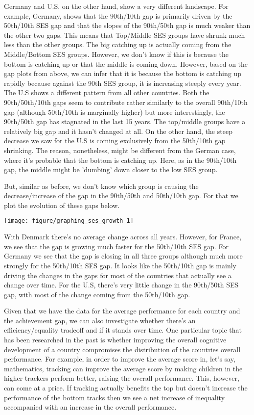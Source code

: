 \documentclass[11pt, a4paper]{article}\usepackage[]{graphicx}\usepackage[]{color}
\begin{document}
Germany and U.S, on the other hand, show a very different landscape. For example, Germany, shows that the 90th/10th gap is primarily driven by the 50th/10th SES gap and that the slopes of the 90th/50th gap is much weaker than the other two gaps. This means that Top/Middle SES groups have shrunk much less than the other groups. The big catching up is actually coming from the Middle/Bottom SES groups. However, we don't know if this is because the bottom is catching up or that the middle is coming down. However, based on the gap plots from above, we can infer that it is because the bottom is catching up rapidly because against the 90th SES group, it is increasing steeply every year. The U.S shows a different pattern from all other countries. Both the 90th/50th/10th gaps seem to contribute rather similarly to the overall 90th/10th gap (although 50th/10th is marginally higher) but more interestingly, the 90th/50th gap has stagnated in the last 15 years. The top/middle groups have a relatively big gap and it hasn't changed at all. On the other hand, the steep decrease we saw for the U.S is coming exclusively from the 50th/10th gap shrinking. The reason, nonetheless, might be different from the German case, where it's probable that the bottom is catching up. Here, as in the 90th/10th gap, the middle might be 'dumbing' down closer to the low SES group.

But, similar as before, we don't know which group is causing the decrease/increase of the gap in the 90th/50th and 50th/10th gap. For that we plot the evolution of these gaps below.




{\centering \texttt{[image: figure/graphing\_ses\_growth-1]} 

}




With Denmark there's no average change across all years. However, for France, we see that the gap is growing much faster for the 50th/10th SES gap. For Germany we see that the gap is closing in all three groups although much more strongly for the 50th/10th SES gap. It looks like the 50th/10th gap is mainly driving the changes in the gaps for most of the countries that actually see a change over time.  For the U.S, there's very little change in the 90th/50th SES gap, with most of the change coming from the 50th/10th gap.

Given that we have the data for the average performance for each country and the achievement gap, we can also investigate whether there's an efficiency/equality tradeoff and if it stands over time. One particular topic that has been researched in the past is whether improving the overall cognitive development of a country compromises the distribution of the countries overall performance. For example, in order to improve the average score in, let's say, mathematics, tracking can improve the average score by making children in the higher trackers perform better, raising the overall performance. This, however, can come at a price. If tracking actually benefits the top but doesn't increase the performance of the bottom tracks then we see a net increase of inequality accompanied with an increase in the overall performance.
\end{document}
